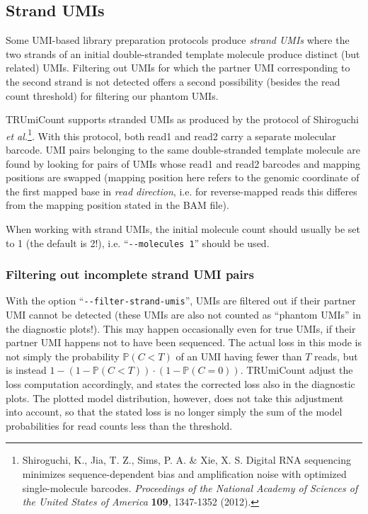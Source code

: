 \documentclass[a4paper]{scrartcl}
\makeatletter
\let\subsection@phlo\subsection
\renewcommand\subsection{\needspace{5\baselineskip}\subsection@phlo}
\newcommand{\ddarg}[1]{\texttt{-{}-#1}}
\makeatother
\begin{document}
\subsection{Strand UMIs}\label{strand-umis}

Some UMI-based library preparation protocols produce \emph{strand UMIs} where the two strands of an initial double-stranded template molecule produce distinct (but related) UMIs. Filtering out UMIs for which the partner UMI corresponding to the second strand is not detected offers a second possibility (besides the read count threshold) for filtering our phantom UMIs.

TRUmiCount supports stranded UMIs as produced by the protocol of Shiroguchi \textit{et al.}\footnote{Shiroguchi, K., Jia, T. Z., Sims, P. A. \& Xie, X. S. Digital RNA sequencing minimizes sequence-dependent bias and amplification noise with optimized single-molecule barcodes. \textit{Proceedings of the National Academy of Sciences of the United States of America} \textbf{109}, 1347-1352 (2012).}. With this protocol, both read1 and read2 carry a separate molecular barcode. UMI pairs belonging to the same double-stranded template molecule are found by looking for pairs of UMIs whose read1 and read2 barcodes and mapping positions are swapped (mapping position here refers to the genomic coordinate of the first mapped base in \emph{read direction}, i.e. for reverse-mapped reads this differes from the mapping position stated in the BAM file).

When working with strand UMIs, the initial molecule count should usually be set to 1 (the default is 2!), i.e. ``\ddarg{molecules 1}'' should be used.

\subsubsection*{Filtering out incomplete strand UMI pairs}

With the option ``\ddarg{filter-strand-umis}'', UMIs are filtered out if their partner UMI cannot be detected (these UMIs are also not counted as ``phantom UMIs'' in the diagnostic plots!). This may happen occasionally even for true UMIs, if their partner UMI happens not to have been sequenced. The actual loss in this mode is not simply the probability $\mathbb{P}(C < T)$ of an UMI having fewer than $T$ reads, but is instead $1 - (1 - \mathbb{P}(C < T))\cdot (1 - \mathbb{P}(C=0))$. TRUmiCount adjust the loss computation accordingly, and states the corrected loss also in the diagnostic plots. The plotted model distribution, however, does not take this adjustment into account, so that the stated loss is no longer simply the sum of the model probabilities for read counts less than the threshold.
\end{document}
